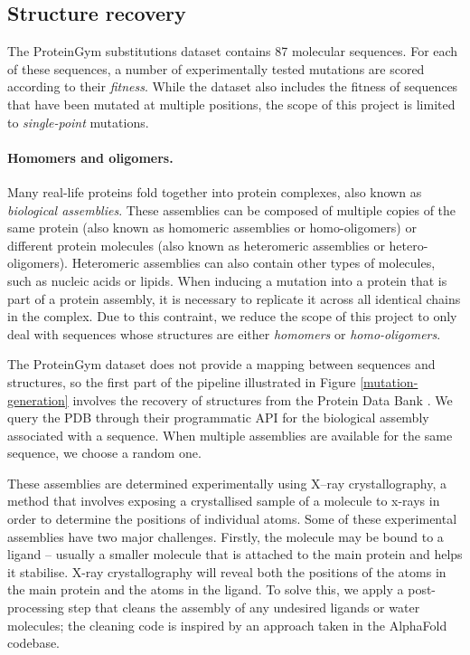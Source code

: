 \subsection{Structure recovery}

The ProteinGym substitutions dataset \cite{tranception} contains 87 molecular sequences. For each of these sequences, a number of experimentally tested mutations are scored according to their \textit{fitness}. While the dataset also includes the fitness of sequences that have been mutated at multiple positions, the scope of this project is limited to \textit{single-point} mutations. 

\paragraph{Homomers and oligomers.} Many real-life proteins fold together into protein complexes, also known as \textit{biological assemblies}.
These assemblies can be composed of multiple copies of the same protein (also known as homomeric assemblies or homo-oligomers) or different protein molecules (also known as heteromeric assemblies or hetero-oligomers).
Heteromeric assemblies can also contain other types of molecules, such as  nucleic acids or lipids.
When inducing a mutation into a protein that is part of a protein assembly, it is necessary to replicate it across all identical chains in the complex. Due to this contraint, we reduce the scope of this project to only deal with sequences whose structures are either \textit{homomers} or \textit{homo-oligomers}. 

The ProteinGym dataset does not provide a mapping between sequences and structures, so the first part of the pipeline illustrated in Figure \ref{mutation-generation} involves the recovery of structures from the Protein Data Bank \cite{rcsb_pdb}. We query the PDB through their programmatic API for the biological assembly associated with a sequence. When multiple assemblies are available for the same sequence, we choose a random one. 

These assemblies are determined experimentally using X–ray crystallography, a method that involves exposing a crystallised sample of a molecule to x-rays in order to determine the positions of individual atoms. Some of these experimental assemblies have two major challenges. Firstly, the molecule may be bound to a ligand – usually a smaller molecule that is attached to the main protein and helps it stabilise. X-ray crystallography will reveal both the positions of the atoms in the main protein and the atoms in the ligand. To solve this, we apply a post-processing step that cleans the assembly of any undesired ligands or water molecules; the cleaning code is inspired by an approach taken in the AlphaFold \cite{alphafold} codebase.

